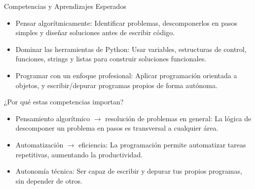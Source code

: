 \documentclass{beamer}
\begin{document}
    \begin{frame}[label=competencias]{Competencias y Aprendizajes Esperados}
        \begin{itemize}
            \item Pensar algorítmicamente: Identificar problemas, descomponerlos en pasos simples y diseñar soluciones antes 
            de escribir código.
            \item Dominar las herramientas de Python: Usar variables, estructuras de control, funciones, strings y 
            listas para construir soluciones funcionales.
            \item Programar con un enfoque profesional: Aplicar programación orientada a objetos, y escribir/depurar programas propios 
            de forma autónoma.
        \end{itemize}
    \end{frame}

    \begin{frame}{¿Por qué estas competencias importan?}
        \begin{itemize}
            \item Pensamiento algorítmico $\rightarrow$ resolución de problemas en general: La lógica de descomponer un problema en 
            pasos es transversal a cualquier área.
            \item Automatización $\rightarrow$ eficiencia: La programación permite automatizar tareas repetitivas, aumentando la productividad.
            \item Autonomía técnica: Ser capaz de escribir y depurar tus propios programas, sin depender de otros.
        \end{itemize}
    \end{frame}

\end{document}

